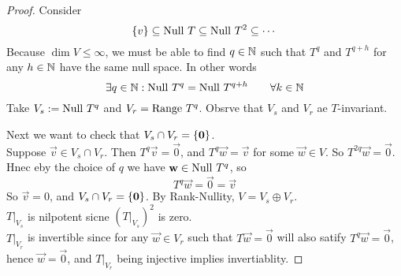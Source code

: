 \begin{proof}
Consider 
\[ \left\{ v \right\} \subseteq \text{Null } T \subseteq \text{Null } T^2 \subseteq \cdots\]
Because $\dim V \leq \infty$, we must be able to find $q \in \mathbb N$ such that $T^q$ and $T^{q+h}$ for any $h \in \mathbb N$ have the same null space. In other words 
\[ \exists q\in \mathbb N : \text{Null } T^q = \text{Null } T^{q + h} \qquad \forall k \in \mathbb N\]
Take $V_s : = \text{Null } T^q$ and $V_r = \text{Range } T^q$. Obsrve that $V_s$ and $V_r$ ae $T$-invariant. 

\noindent Next we want to check that $V_s \cap V_r = \left\{ \mathbf 0 \right\}$. \\ 
Suppose $\vec v \in V_s \cap V_r$. Then $T^q \vec v = \vec 0$, and $T^q \vec w = \vec v$ for some $\vec w \in V$. So $T^{2q}\vec w = \vec 0$. Hnec eby the choice of $q$ we have $\mathbf w \in \text{Null } T^q$, so \[T^q \vec w = \vec 0 = \vec v\]
So $\vec v = 0$, and $V_s \cap V_r = \left\{ \mathbf 0 \right\}$. By Rank-Nullity, $V = V_s \oplus V_r$. \\
$T\vert_{V_s}$ is nilpotent sicne $\left(T\vert_{V_s}\right)^2$ is zero. \\
$T\vert_{V_r}$ is invertible since for any $\vec w \in V_r$ such that $T \vec w = \vec 0$ will also satify $T^q \vec w = \vec 0$, hence $\vec w = \vec 0$, and $T\vert_{V_r}$ being injective implies invertiablity.
\end{proof}
